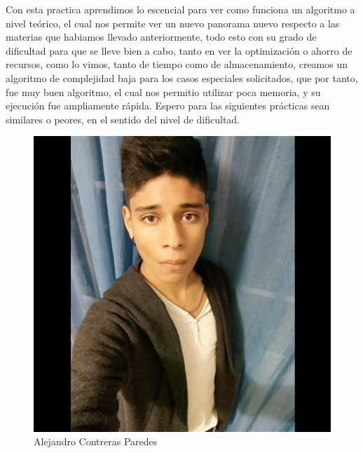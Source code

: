 \documentclass[12pt,twoside]{article}
\begin{document}
Con esta practica aprendimos lo escencial para ver como funciona un algoritmo a nivel te\'orico, el cual nos
permite ver un nuevo panorama nuevo respecto a las materias que habiamos llevado anteriormente, todo esto con 
su grado de dificultad para que se lleve bien a cabo, tanto en ver la optimizaci\'on o ahorro de recursos, como 
lo vimos, tanto de tiempo como de almacenamiento, creamos un algoritmo de complejidad baja para los casos 
especiales solicitados, que por tanto, fue muy buen algoritmo, el cual nos permitio utilizar poca memoria, y su 
ejecuci\'on fue ampliamente r\'apida. Espero para las siguientes pr\'acticas sean similares o peores, en el sentido
del nivel de dificultad.
\begin{figure}[!h]
	\centering
	\begin{minipage}[t]{10cm}
		\centering
		\includegraphics[scale=0.2]{Foto1}
		\caption{Alejandro Contreras Paredes}
	\end{minipage}
	\hspace{18cm}
	\begin{minipage}[t]{10cm}
		\centering

\end{minipage}
\end{figure}
\end{document}
